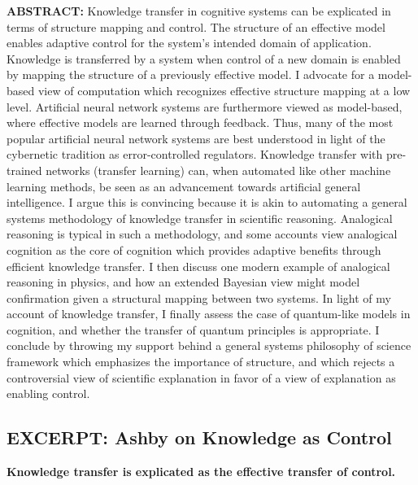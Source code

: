 \documentclass[11pt, oneside]{article}   	%
\begin{document}
\noindent \textbf{ABSTRACT:} Knowledge transfer in cognitive systems can be explicated in terms of structure mapping and control.  The structure of an effective model enables adaptive control for the system's intended domain of application.  Knowledge is transferred by a system when control of a new domain is enabled by mapping the structure of a previously effective model.  I advocate for a model-based view of computation which recognizes effective structure mapping at a low level.  Artificial neural network systems are furthermore viewed as model-based, where effective models are learned through feedback.  Thus, many of the most popular artificial neural network systems are best understood in light of the cybernetic tradition as error-controlled regulators.  Knowledge transfer with pre-trained networks (transfer learning) can, when automated like other machine learning methods, be seen as an advancement towards artificial general intelligence.  I argue this is convincing because it is akin to automating a general systems methodology of knowledge transfer in scientific reasoning.  Analogical reasoning is typical in such a methodology, and some accounts view analogical cognition as the core of cognition which provides adaptive benefits through efficient knowledge transfer.  I then discuss one modern example of analogical reasoning in physics, and how an extended Bayesian view might model confirmation given a structural mapping between two systems. In light of my account of knowledge transfer, I finally assess the case of quantum-like models in cognition, and whether the transfer of quantum principles is appropriate. I conclude by throwing my support behind a general systems philosophy of science framework which emphasizes the importance of structure, and which rejects a controversial view of scientific explanation in favor of a view of explanation as enabling control.


\subsection{EXCERPT: Ashby on Knowledge as Control}

\noindent \textbf{Knowledge transfer is explicated as the effective transfer of control.}\\
\end{document}
